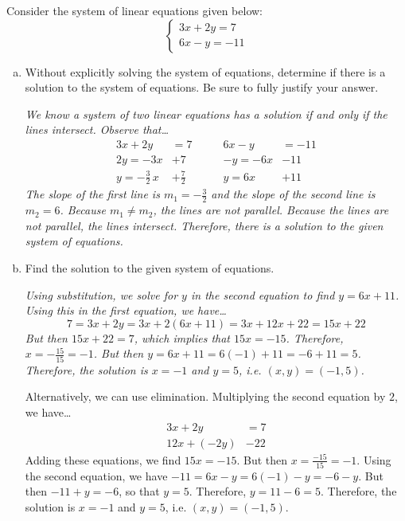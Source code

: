 \documentclass[12pt,letterpaper]{exam}
\begin{document}
\begin{questions}
\newpage
\question[15] Consider the system of linear equations given below:
	\[
	\begin{cases}
	3x + 2y= 7 \\
	6x - y= -11
	\end{cases}
	\]

\begin{enumerate}[(a)]
\item Without explicitly solving the system of equations, determine if there is a solution to the system of equations. Be sure to fully justify your answer. \pspace

{\scriptsize \itshape We know a system of two linear equations has a solution if and only if the lines intersect. Observe that\dots
	\[
	\begin{aligned}
	3x + 2y&= 7 \qquad& 6x - y&= -11 \\
	2y= -3x& + 7 & -y= -6x& - 11 \\
	y= -\frac{3}{2}\, x & + \frac{7}{2} & y= 6x& + 11
	\end{aligned}
	\]
The slope of the first line is $m_1= -\frac{3}{2}$ and the slope of the second line is $m_2= 6$. Because $m_1 \neq m_2$, the lines are not parallel. Because the lines are not parallel, the lines intersect. Therefore, there is a solution to the given system of equations.}

\item Find the solution to the given system of equations. \pspace

{\itshape Using substitution, we solve for $y$ in the second equation to find $y= 6x + 11$. Using this in the first equation, we have\dots
	\[
	7= 3x + 2y= 3x + 2(6x + 11)= 3x + 12x + 22= 15x + 22
	\]
But then $15x + 22= 7$, which implies that $15x= -15$. Therefore, $x= -\frac{15}{15}= -1$. But then $y= 6x + 11= 6(-1) + 11= -6 + 11= 5$. Therefore, the solution is $x= -1$ and $y= 5$, i.e. $(x, y)= (-1, 5)$. \pspace

Alternatively, we can use elimination. Multiplying the second equation by $2$, we have\dots
	\[
	\begin{aligned}
	3x + 2y&= 7 \\
	12x + (-2y)& -22
	\end{aligned}
	\]
Adding these equations, we find $15x= -15$. But then $x= \frac{-15}{15}= -1$. Using the second equation, we have $-11= 6x - y= 6(-1) - y= -6 - y$. But then $-11 + y= -6$, so that $y= 5$. Therefore, $y= 11 - 6= 5$. Therefore, the solution is $x= -1$ and $y= 5$, i.e. $(x, y)= (-1, 5)$.}


\end{enumerate}
\end{questions}
\end{document}
